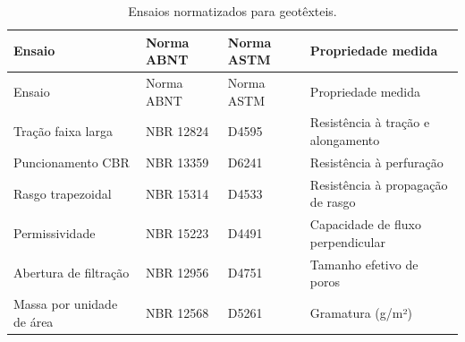 \documentclass[
  portuguese,
  11pt,
  a4paper,
  open=any]{scrbook}
\begin{document}
\begin{longtable}[]{@{}
  >{\raggedright\arraybackslash}p{}
  >{\raggedright\arraybackslash}p{}
  >{\raggedright\arraybackslash}p{}
  >{\raggedright\arraybackslash}p{}@{}}
\caption{Ensaios normatizados para
geotêxteis.}\label{tbl-ensaios}\tabularnewline
\toprule\noalign{}
\begin{minipage}[b]{\linewidth}\raggedright
Ensaio
\end{minipage} & \begin{minipage}[b]{\linewidth}\raggedright
Norma ABNT
\end{minipage} & \begin{minipage}[b]{\linewidth}\raggedright
Norma ASTM
\end{minipage} & \begin{minipage}[b]{\linewidth}\raggedright
Propriedade medida
\end{minipage} \\
\midrule\noalign{}
\endfirsthead
\toprule\noalign{}
\begin{minipage}[b]{\linewidth}\raggedright
Ensaio
\end{minipage} & \begin{minipage}[b]{\linewidth}\raggedright
Norma ABNT
\end{minipage} & \begin{minipage}[b]{\linewidth}\raggedright
Norma ASTM
\end{minipage} & \begin{minipage}[b]{\linewidth}\raggedright
Propriedade medida
\end{minipage} \\
\midrule\noalign{}
\endhead
\bottomrule\noalign{}
\endlastfoot
Tração faixa larga & NBR 12824 & D4595 & Resistência à tração e
alongamento \\
Puncionamento CBR & NBR 13359 & D6241 & Resistência à perfuração \\
Rasgo trapezoidal & NBR 15314 & D4533 & Resistência à propagação de
rasgo \\
Permissividade & NBR 15223 & D4491 & Capacidade de fluxo
perpendicular \\
Abertura de filtração & NBR 12956 & D4751 & Tamanho efetivo de poros \\
Massa por unidade de área & NBR 12568 & D5261 & Gramatura (g/m²) \\
\end{longtable}
\end{document}
